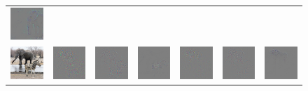 \begin{figure}
\begin{center}
\begin{tabular}{ccccccc}
\includegraphics[width=0.14\linewidth,height=0.115\linewidth]{figs/examples/googlenet/soft/zeb-ele1_diff_387} \\
\includegraphics[width=0.14\linewidth,height=0.115\linewidth]{figs/examples/googlenet/oxford/zeb-ele2} &
\includegraphics[width=0.14\linewidth,height=0.115\linewidth]{figs/examples/googlenet/oxford/zeb-ele2_diff_341} &
\includegraphics[width=0.14\linewidth,height=0.115\linewidth]{figs/examples/googlenet/deconv/zeb-ele2_diff_341} &
\includegraphics[width=0.14\linewidth,height=0.115\linewidth]{figs/examples/googlenet/soft/zeb-ele2_diff_341} &
\includegraphics[width=0.14\linewidth,height=0.115\linewidth]{figs/examples/googlenet/oxford/zeb-ele2_diff_387} &
\includegraphics[width=0.14\linewidth,height=0.115\linewidth]{figs/examples/googlenet/deconv/zeb-ele2_diff_387} &
\includegraphics[width=0.14\linewidth,height=0.115\linewidth]{figs/examples/googlenet/soft/zeb-ele2_diff_387} \\

\end{tabular}
\end{center}
\end{figure}
